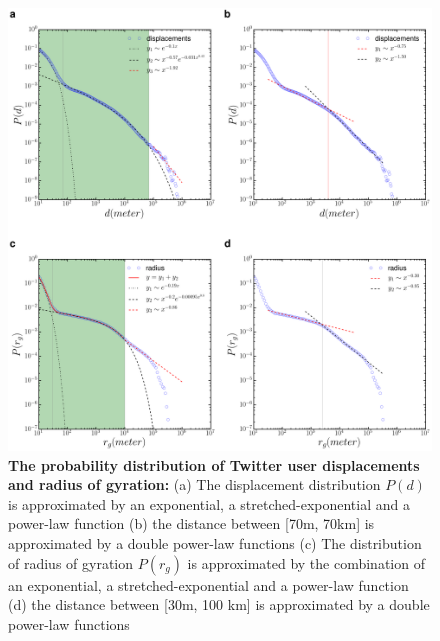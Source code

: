 \documentclass[10pt,letterpaper]{article}
\begin{document}
\begin{figure}[ht]
\includegraphics[width=1.0\linewidth]{./figure/PNG/S4_radius_displacement}
\caption{{\bf The probability distribution of Twitter user displacements and radius of gyration:} (a) The displacement distribution $P(d)$ is approximated by an exponential, a stretched-exponential and a power-law function (b) the distance between [70m, 70km] is approximated by a double power-law functions (c) The distribution of radius of gyration $P(r_g)$ is approximated by the combination of an exponential, a stretched-exponential and a power-law function (d) the distance between [30m, 100 km] is approximated by a double power-law functions}
\label{S4_Fig}
\end{figure}
\end{document}

